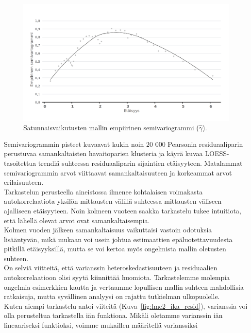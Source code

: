 \documentclass[finnish]{docopts}
\begin{document}
\begin{figure}[H]
\centering
  \includegraphics[scale=0.8]{kuvaajat/lme2_vario.png}
  \caption{Satunnaisvaikutusten mallin empiirinen semivariogrammi ($\hat{\gamma}$).}
  \label{fig:lme2_vario}
\end{figure}

Semivariogrammin pisteet kuvaavat kukin noin 20 000 Pearsonin residuaaliparin perustuvaa samankaltaisten havaitoparien klusteria ja käyrä kuvaa LOESS-tasoitettua trendiä suhteessa residuaaliparin sijaintien etäisyyteen. Matalammat semivariogrammin arvot viittaavat samankaltaisuuteen ja korkeammat arvot erilaisuuteen.\\

Tarkastelun perusteella aineistossa ilmenee kohtalaisen voimakasta autokorrelaatiota yksilön mittausten välillä suhteessa mittausten väliseen ajalliseen etäisyyteen. Noin kolmeen vuoteen saakka tarkastelu tukee intuitiota, että lähellä olevat arvot ovat samankaltaisempia.\\

Kolmen vuoden jälkeen samankaltaisuus vaikuttaisi vastoin odotuksia lisääntyvän, mikä \cite{pinheiro00} mukaan voi usein johtua estimaattien epäluotettavuudesta pitkillä etäisyyksillä, mutta se voi kertoa myös ongelmista mallin oletusten suhteen.\\

On selviä viitteitä, että varianssin heteroskedastisuuteen ja residuaalien autokorrelaatioon olisi syytä kiinnittää huomiota. Tarkastelemme molempia ongelmia esimerkkien kautta ja vertaamme lopullisen mallin suhteen mahdollisia ratkaisuja, mutta syvällinen analyysi on rajattu tutkielman ulkopuolelle.\\

Kuten aiempi tarkastelu antoi viiteitä (Kuva~\ref{fig:lme2_ika_resid}), varianssia voi olla perusteltua tarkastella iän funktiona. Mikäli oletamme varianssin iän lineaariseksi funktioksi, voimme \cite{pinheiro00} mukaillen määritellä varianssiksi
\end{document}
